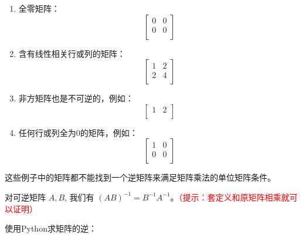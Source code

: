 \begin{enumerate}
\item 全零矩阵：
   \[
   \begin{bmatrix}
   0 & 0 \\
   0 & 0 \\
   \end{bmatrix}
   \]

\item 含有线性相关行或列的矩阵：
   \[
   \begin{bmatrix}
   1 & 2 \\
   2 & 4 \\
   \end{bmatrix}
   \]

\item 非方矩阵也是不可逆的，例如：
   \[
   \begin{bmatrix}
   1 & 2 \\
   \end{bmatrix}
   \]

\item 任何行或列全为0的矩阵，例如：
   \[
   \begin{bmatrix}
   1 & 0 \\
   0 & 0 \\
   \end{bmatrix}
   \]
\end{enumerate}

这些例子中的矩阵都不能找到一个逆矩阵来满足矩阵乘法的单位矩阵条件。

\begin{theorem}[矩阵的逆运算的性质]
    对可逆矩阵 $A, B$, 我们有 $(A B)^{-1}=B^{-1} A^{-1}$。\textcolor{red}{（提示：套定义和原矩阵相乘就可以证明）}
\end{theorem}

使用Python求矩阵的逆：


